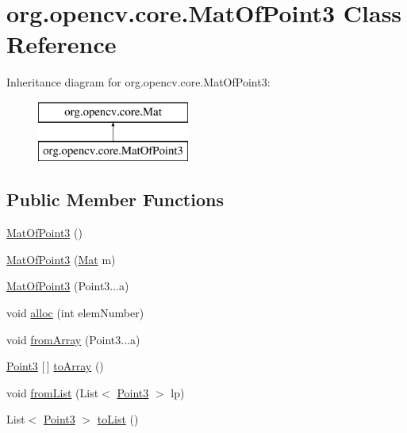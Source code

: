 \hypertarget{classorg_1_1opencv_1_1core_1_1_mat_of_point3}{}\section{org.\+opencv.\+core.\+Mat\+Of\+Point3 Class Reference}
\label{classorg_1_1opencv_1_1core_1_1_mat_of_point3}
Inheritance diagram for org.\+opencv.\+core.\+Mat\+Of\+Point3\+:\begin{figure}[H]
\begin{center}
\leavevmode
\includegraphics[height=2.000000cm]{classorg_1_1opencv_1_1core_1_1_mat_of_point3}
\end{center}
\end{figure}
\subsection*{Public Member Functions}
\begin{DoxyCompactItemize}
\item 
\mbox{\hyperlink{classorg_1_1opencv_1_1core_1_1_mat_of_point3_acf0234de1fb5dde8d1af630c4b3b1f81}{Mat\+Of\+Point3}} ()
\item 
\mbox{\hyperlink{classorg_1_1opencv_1_1core_1_1_mat_of_point3_a56df2567defef1fe344ead81bcddc2ee}{Mat\+Of\+Point3}} (\mbox{\hyperlink{classorg_1_1opencv_1_1core_1_1_mat}{Mat}} m)
\item 
\mbox{\hyperlink{classorg_1_1opencv_1_1core_1_1_mat_of_point3_a9d1b0fed48253dbc260d306bbb4a9227}{Mat\+Of\+Point3}} (Point3...\+a)
\item 
void \mbox{\hyperlink{classorg_1_1opencv_1_1core_1_1_mat_of_point3_a9e9e6e0ed5dae67ad871718a1fa9fed4}{alloc}} (int elem\+Number)
\item 
void \mbox{\hyperlink{classorg_1_1opencv_1_1core_1_1_mat_of_point3_a458e832be8df623352505fb50be8cb6c}{from\+Array}} (Point3...\+a)
\item 
\mbox{\hyperlink{classorg_1_1opencv_1_1core_1_1_point3}{Point3}} \mbox{[}$\,$\mbox{]} \mbox{\hyperlink{classorg_1_1opencv_1_1core_1_1_mat_of_point3_a073050ec29339f38ce6e7882d05a48b6}{to\+Array}} ()
\item 
void \mbox{\hyperlink{classorg_1_1opencv_1_1core_1_1_mat_of_point3_aaa49e5c5408e421d126c98f277c404e7}{from\+List}} (List$<$ \mbox{\hyperlink{classorg_1_1opencv_1_1core_1_1_point3}{Point3}} $>$ lp)
\item 
List$<$ \mbox{\hyperlink{classorg_1_1opencv_1_1core_1_1_point3}{Point3}} $>$ \mbox{\hyperlink{classorg_1_1opencv_1_1core_1_1_mat_of_point3_a0dd9fcf2f4b85968e6c0f94f83453a1e}{to\+List}} ()
\end{DoxyCompactItemize}
